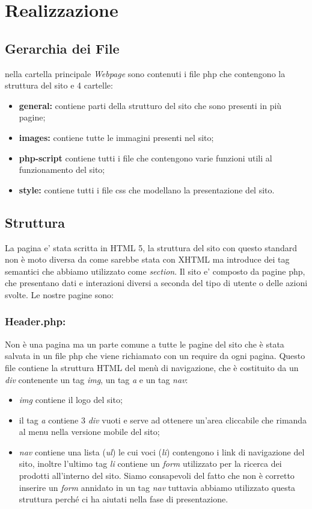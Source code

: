 \section{Realizzazione}
\subsection{Gerarchia dei File}
nella cartella principale \textit{Webpage} sono contenuti i file php che contengono la struttura del sito e 4 cartelle:
\begin{itemize}
	\item \textbf{general:} contiene parti della strutturo del sito che sono presenti in più pagine;
	\item \textbf{images:} contiene tutte le immagini presenti nel sito;
	\item \textbf{php-script} contiene tutti i file che contengono varie funzioni utili al funzionamento del sito;
	\item \textbf{style:} contiene tutti i file css che modellano la presentazione del sito.
\end{itemize}
\subsection{Struttura}
La pagina e' stata scritta in HTML 5, la struttura del sito con questo standard non è moto diversa da come sarebbe stata con XHTML ma introduce dei tag semantici che abbiamo utilizzato come \emph{section}.\newline
Il sito e' composto da pagine php, che presentano dati e interazioni diversi a seconda del tipo di utente o delle azioni svolte.
Le nostre pagine sono:

	
 \subsubsection{Header.php:}\Spazio Non è una pagina ma un parte comune a tutte le pagine del sito che è stata salvata in un file php che viene richiamato con un require da ogni pagina. Questo file contiene la struttura HTML del menù di navigazione, che è costituito da un \emph{div} contenente un tag \emph{img}, un tag \emph{a} e un tag \emph{nav}:
 \begin{itemize}
 	\item \emph{img} contiene il logo del sito;
 	\item il tag \emph{a} contiene 3 \emph{div} vuoti e serve ad ottenere un'area cliccabile che rimanda al menu nella versione mobile del sito; 
 	\item \emph{nav} contiene una lista (\emph{ul}) le cui voci (\emph{li}) contengono i link di navigazione del sito, inoltre l'ultimo tag \emph{li} contiene un \emph{form} utilizzato per la ricerca dei prodotti all'interno del sito. \newline
 	Siamo consapevoli del fatto che non è corretto inserire un \emph{form} annidato in un tag \emph{nav} tuttavia abbiamo utilizzato questa struttura perché ci ha aiutati nella fase di presentazione.
 	
 \end{itemize}


